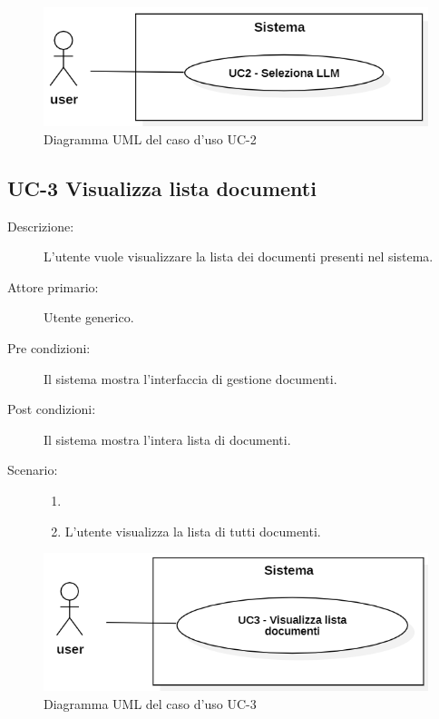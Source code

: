 \begin{figure}[H]
    \centering
    \includegraphics[width=0.8\linewidth]{UC2.PNG}
    \caption{Diagramma UML del caso d'uso UC-2}
    \label{fig:UC2}
\end{figure}

\subsection{UC-3 Visualizza lista documenti}
\begin{description}
    \item[Descrizione:] L’utente vuole visualizzare la lista dei documenti presenti nel sistema.
    \item[Attore primario:] Utente generico.
    \item[Pre condizioni:] Il sistema mostra l’interfaccia di gestione documenti.
    \item[Post condizioni:] Il sistema mostra l’intera lista di documenti.
    \item[Scenario:] 
    \begin{enumerate}
        \item[]
        \item L’utente visualizza la lista di tutti documenti.
    \end{enumerate}
\end{description}

\begin{figure}[H]
    \centering
    \includegraphics[width=0.8\linewidth]{UC3.PNG}
    \caption{Diagramma UML del caso d'uso UC-3}
    \label{fig:UC3}
\end{figure}

